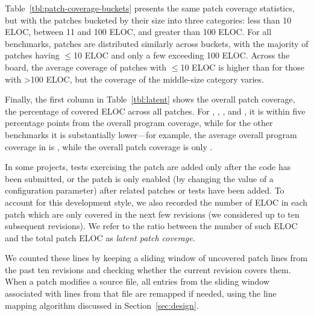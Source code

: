 Table~\ref{tbl:patch-coverage-buckets} presents the same patch
coverage statistics, but with the patches bucketed by their size into
three categories: less than 10 ELOC, between 11 and 100 ELOC, and
greater than 100 ELOC.  For all benchmarks, patches are distributed
similarly across buckets, with the majority of patches having $\le$10
ELOC and only a few exceeding 100 ELOC.  Across the board, the average
coverage of patches with $\le$10 ELOC is higher than for those with
\textgreater100 ELOC, but the coverage of the middle-size category varies.

Finally, the first column in Table~\ref{tbl:latent} shows the overall
patch coverage, \ie the percentage of covered ELOC across all patches.  For
\beanstalkd, \binutils, \git, \memcached and \vim, it is within five percentage
points from the overall program coverage, while for the other benchmarks it is
substantially lower---for example, the average overall program coverage in
\redis is \redisCoverageAverage, while the overall patch coverage is only
\redisOverallPatchCoverage.




In some projects, tests exercising the patch are added only after the
code has been submitted, or the patch is only enabled (\eg by changing
the value of a configuration parameter) after related patches or tests
have been added.  To account for this development style, we also
recorded the number of ELOC in each patch which are only covered in
the next few revisions (we considered up to ten subsequent revisions).
We refer to the ratio between the number of such ELOC and the total
patch ELOC as \textit{latent patch coverage}.

We counted these lines by keeping a sliding window of uncovered
patch lines from the past ten revisions and checking whether the
current revision covers them.  When a patch modifies a
source file, all entries from the sliding window associated with lines
from that file are remapped if needed, using the line mapping algorithm
discussed in Section~\ref{sec:design}.

